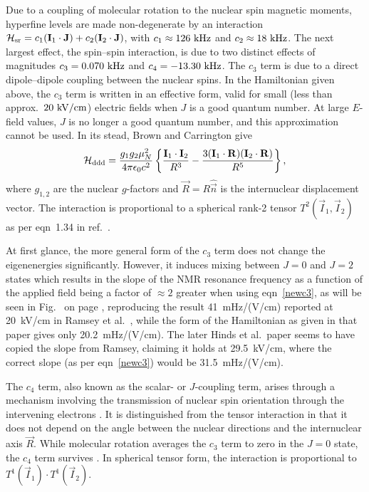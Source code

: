 Due to a coupling of molecular rotation to the nuclear spin magnetic moments,
hyperfine levels are made non-degenerate by an interaction
$\mathcal{H}_\text{sr}=c_1(\mathbf{I}_1\cdot\mathbf{J})+c_2(\mathbf{I}_2\cdot\mathbf{J})$, with
$c_1\approx126~\mathrm{kHz}$ and $c_2\approx18~\mathrm{kHz}$. The next largest effect, the
spin--spin interaction, is due to two distinct effects of magnitudes
$c_3=0.070~\mathrm{kHz}$ and $c_4=-13.30~\mathrm{kHz}$. The $c_3$ term is due to a direct
dipole--dipole coupling between the nuclear spins. In the Hamiltonian given
above, the $c_3$ term is written in an effective form, valid for small (less
than approx.\ $20~\mathrm{kV/cm}$) electric fields when $J$ is a good quantum number. At
large $E$-field values, $J$ is no longer a good quantum number, and this
approximation cannot be used. In its stead, Brown and Carrington
\cite[eqn~4.17]{brown2003rotational} give
%
\begin{equation}
    \label{newc3}
\mathcal{H}_\text{ddd}=\frac{g_1g_2\mu_N^2}{4\pi\epsilon_0c^2}
\left\{
    \frac{\mathbf{I}_1\cdot\mathbf{I}_2}{R^3}
    -\frac{3(\mathbf{I}_1\cdot\mathbf{R})(\mathbf{I}_2\cdot\mathbf{R})}{R^5}
\right\},
\end{equation}
%
where $g_{1,2}$ are the nuclear $g$-factors and $\vec R=R\hat{\vec n}$ is the
internuclear displacement vector. The interaction is proportional to a spherical
rank-2 tensor $T^2(\vec I_1,\vec I_2)$ as per eqn~1.34 in
ref.~\cite{brown2003rotational}.

At first glance, the more general form of the $c_3$ term does not change the
eigenenergies significantly. However, it induces mixing between $J=0$ and $J=2$
states which results in the slope of the \gls{NMR} resonance frequency
as a function of the applied field being a factor of $\approx2$ greater when using
eqn~\ref{newc3}, as will be seen in Fig.~ on page \pageref{Cslope},
reproducing the result 41~mHz/(V/cm) reported at 20~kV/cm in Ramsey et al.\
\cite{wilkening1984search}, while the form of the Hamiltonian as given in that
paper gives only 20.2~mHz/(V/cm). The later Hinds et al.\ paper
\cite{cho1991search, cho1990thesis} seems to have copied the slope from Ramsey,
claiming it holds at 29.5~kV/cm, where the correct slope (as per
eqn~\ref{newc3}) would be 31.5~mHz/(V/cm).

The $c_4$ term, also known as the scalar- or $J$-coupling term, arises through a
mechanism involving the transmission of nuclear spin orientation through the
intervening electrons \cite{brown2003rotational}. It is distinguished from the
tensor interaction in that it does not depend on the angle between the nuclear
directions and the internuclear axis $\vec R$. While molecular rotation averages
the $c_3$ term to zero in the $J=0$ state, the $c_4$ term survives
\cite[sect.~7.7]{budker2004atomic}. In spherical tensor form, the interaction is
proportional to $T^1(\vec I_1)\cdot T^1(\vec I_2)$.

